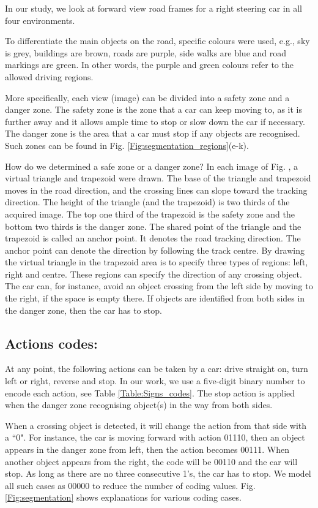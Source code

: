 \documentclass[conference]{IEEEtran}
\begin{document}
		In our study, we look at forward view road frames for a right steering car in all four environments. 
		
		To differentiate the main objects on the road, specific colours were used, e.g., sky is grey, buildings are brown, roads are purple, side walks are blue and road markings are green. In other words, the purple and green colours refer to the allowed driving regions.  
		
		More specifically, each view (image) can be divided into a safety zone and a danger zone. The safety zone is the zone that a car can keep moving to, as it is further away and it allows ample time to stop or slow down the car if necessary. The danger zone is the area that a car must stop if any objects are recognised. Such zones can be found in Fig. \ref{Fig:segmentation_regions}(e-k). 
		
		How do we determined a safe zone or a danger zone? In each image of Fig. \label{Fig:segmentation_regions1}, a virtual triangle and trapezoid were drawn. The base of the triangle and trapezoid moves in the road direction, and the crossing lines can slope toward the tracking direction. The height of the triangle (and the trapezoid) is two thirds of the acquired image. The top one third of the trapezoid is the safety zone and the bottom two thirds is the danger zone. The shared point of the triangle and the trapezoid is called an anchor point. It denotes the road tracking direction. The anchor point can denote the direction by following the track centre. By drawing the virtual triangle in the trapezoid area is to specify three types of regions: left, right and centre. These regions can specify the direction of any crossing object. The car can, for instance, avoid an object crossing from the left side by moving to the right, if the space is empty there. If objects are identified from both sides in the danger zone, then the car has to stop.  
	
	\subsection{Actions codes:} 
		At any point, the following actions can be taken by a car: drive straight on, turn left or right, reverse and stop. In our work, we use a five-digit binary number to encode each action, see Table \ref{Table:Signs_codes}. The stop action is applied when the danger zone recognising object(s) in the way from both sides. 
		
		When a crossing object is detected, it will change the action from that side with a ``0". For instance, the car is moving forward with action 01110, then an object appears in the danger zone from left, then the action becomes 00111. When another object appears from the right, the code will be 00110 and the car will stop. As long as there are no three consecutive 1's, the car has to stop.  We model all such cases as 00000 to reduce the number of coding values. Fig. \ref{Fig:segmentation} shows explanations for various coding cases.
\end{document}
